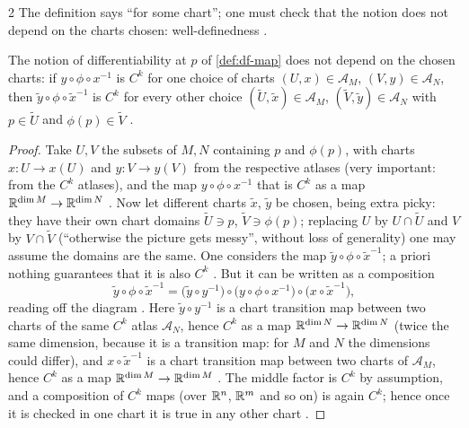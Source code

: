 \begin{paracol}{2}
The definition says ``for some chart''; one must check that the notion does not depend on the charts chosen: well-definedness .
\begin{proposition}\label{prop:df-welldef}
The notion of differentiability at $p$ of \cref{def:df-map} does not depend on the chosen charts: if $y\circ\phi\circ x^{-1}$ is $C^k$ for one choice of charts $(U,x)\in\mathcal A_M$, $(V,y)\in\mathcal A_N$, then $\tilde y\circ\phi\circ\tilde x^{-1}$ is $C^k$ for every other choice
$(\tilde U,\tilde x)\in\mathcal A_M$, $(\tilde V,\tilde y)\in\mathcal A_N$ with $p\in\tilde U$ and $\phi(p)\in\tilde V$ .
\end{proposition}
\begin{proof}
Take $U,V$ the subsets of $M,N$ containing $p$ and $\phi(p)$, with charts $x\colon U\to x(U)$ and $y\colon V\to y(V)$ from the respective atlases (very important: from the $C^k$ atlases), and the map $y\circ\phi\circ x^{-1}$ that is $C^k$ as a map $\mathbb{R}^{\dim M}\to\mathbb{R}^{\dim N}$
. Now let different charts $\tilde x$, $\tilde y$ be chosen, being extra picky: they have their own chart domains $\tilde U\ni p$, $\tilde V\ni\phi(p)$; replacing $U$ by $U\cap\tilde U$ and $V$ by $V\cap\tilde V$ (``otherwise the picture gets
messy'', without loss of generality) one may assume the domains are the same. One considers the map $\tilde y\circ\phi\circ\tilde x^{-1}$; a priori nothing guarantees that it is also $C^k$ .
But it can be written as a composition
\[
  \tilde y\circ\phi\circ\tilde x^{-1}=\bigl(\tilde y\circ y^{-1}\bigr)\circ\bigl(y\circ\phi\circ x^{-1}\bigr)\circ\bigl(x\circ\tilde x^{-1}\bigr),
\]
reading off the diagram . Here $\tilde y\circ y^{-1}$ is a chart transition map between two charts of the same $C^k$ atlas $\mathcal A_N$, hence $C^k$ as a map $\mathbb{R}^{\dim N}\to\mathbb{R}^{\dim N}$ (twice the same dimension, because it is a transition map: for $M$ and $N$ the dimensions could differ), and
$x\circ\tilde x^{-1}$ is a chart transition map between two charts of $\mathcal A_M$, hence $C^k$ as a map $\mathbb{R}^{\dim M}\to\mathbb{R}^{\dim M}$ .
The middle factor is $C^k$ by assumption, and a composition of $C^k$ maps (over $\mathbb{R}^n$, $\mathbb{R}^m$ and so on) is again $C^k$; hence once it is checked in one chart it is true in any other chart .

\end{proof}
\end{paracol}
